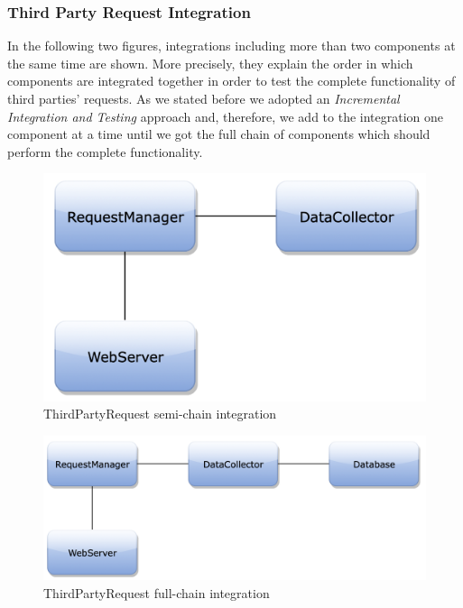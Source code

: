 \newpage
\subsubsection{Third Party Request Integration}
In the following two figures, integrations including more than two components at the same time are shown. More precisely, they explain the order in which components are integrated together in order to test the complete functionality of third parties' requests. As we stated before we adopted  an \textit{Incremental Integration and Testing} approach and, therefore, we add to the integration one component at a time until we got the full chain of components which should perform the complete functionality.
\begin{figure}[H]
\centering
\includegraphics[scale=0.35]{Images/IntegrationPlanImages/fig15.png}
\caption{ThirdPartyRequest semi-chain integration}
\end{figure}

\begin{figure}[H]
\centering
\includegraphics[scale=0.35]{Images/IntegrationPlanImages/fig16.png}
\caption{ThirdPartyRequest full-chain integration}
\end{figure}

